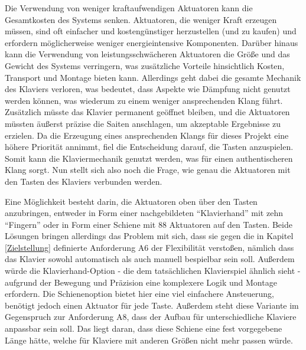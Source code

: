 Die Verwendung von weniger kraftaufwendigen Aktuatoren kann die Gesamtkosten des Systems senken. Aktuatoren, die weniger
Kraft erzeugen müssen, sind oft einfacher und kostengünstiger herzustellen (und zu kaufen) und erfordern möglicherweise weniger
energieintensive Komponenten. Darüber hinaus kann die Verwendung von leistungsschwächeren
Aktuatoren die Größe und das Gewicht des Systems verringern, was zusätzliche Vorteile hinsichtlich Kosten, Transport und
Montage bieten kann. \newline
Allerdings geht dabei die gesamte Mechanik des Klaviers verloren, was bedeutet, dass Aspekte wie Dämpfung nicht genutzt werden können,
was wiederum zu einem weniger ansprechenden Klang führt. Zusätzlich müsste das Klavier permanent geöffnet bleiben, und die
Aktuatoren müssten äußerst präzise die Saiten anschlagen, um akzeptable Ergebnisse zu erzielen.
Da die Erzeugung eines ansprechenden Klangs für dieses Projekt eine höhere Priorität annimmt, fiel die Entscheidung
darauf, die Tasten anzuspielen. Somit kann die Klaviermechanik genutzt werden, was für einen
authentischeren Klang sorgt. \newline
Nun stellt sich also noch die Frage, wie genau die Aktuatoren mit den Tasten des Klaviers verbunden werden.

Eine Möglichkeit besteht darin, die Aktuatoren oben über den Tasten anzubringen, entweder in Form einer nachgebildeten
\enquote{Klavierhand} mit zehn \enquote{Fingern} oder in Form einer Schiene mit 88 Aktuatoren auf den Tasten.
Beide Lösungen bringen allerdings das Problem mit sich, dass sie gegen die in Kapitel \ref{Zielstellung} definierte Anforderung A6
der Flexibilität verstoßen, nämlich dass das Klavier sowohl automatisch als auch manuell bespielbar sein soll.\newline
Außerdem würde die Klavierhand-Option - die dem tatsächlichen Klavierspiel ähnlich sieht -
aufgrund der Bewegung und Präzision eine komplexere Logik und
Montage erfordern. Die Schienenoption bietet hier eine viel einfachere Ansteuerung, benötigt jedoch einen Aktuator für jede Taste.
Außerdem steht diese Variante im Gegenspruch zur Anforderung A8, dass der Aufbau für unterschiedliche Klaviere anpassbar
sein soll. Das liegt daran, dass diese Schiene eine fest vorgegebene Länge hätte, welche für Klaviere mit anderen Größen nicht mehr passen würde. \newline

